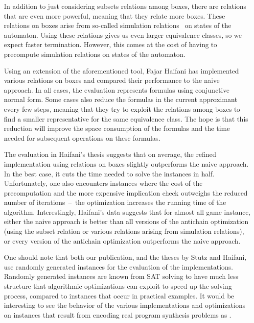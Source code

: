 \documentclass[../../diss.tex]{subfiles}
\begin{document}
In addition to just considering subsets relations among boxes, there are relations that are even more powerful, meaning that they relate more boxes.
These relations on boxes arise from so-called simulation relations~\cite{DillHW91} on states of the automaton.
Using these relations gives us even larger equivalence classes, so we expect faster termination.
However, this comes at the cost of having to precompute simulation relations on states of the automaton.

Using an extension of the aforementioned tool, Fajar Haifani has implemented various relations on boxes and compared their performance to the naive approach.
In all cases, the evaluation represents formulas using conjunctive normal form.
Some cases also reduce the formulas in the current approximant every few steps, meaning that they try to exploit the relations among boxes to find a smaller representative for the same equivalence class.
The hope is that this reduction will improve the space consumption of the formulas and the time needed for subsequent operations on these formulas.

The evaluation in Haifani's thesis suggests that on average, the refined implementation using relations on boxes slightly outperforms the naive approach.
In the best case, it cuts the time needed to solve the instances in half.
Unfortunately, one also encounters instances where the cost of the precomputation and the more expensive implication check outweighs the reduced number of iterations~--~the optimization increases the running time of the algorithm.
Interestingly, Haifani's data suggests that for almost all game instance, either the naive approach is better than all versions of the antichain optimization (using the subset relation or various relations arising from simulation relations), or every version of the antichain optimization outperforms the naive approach.

One should note that both our publication, and the theses by Stutz and Haifani, use randomly generated instances for the evaluation of the implementations.
Randomly generated instances are known from \eg SAT solving to have much less structure that algorithmic optimizations can exploit to speed up the solving process, compared to instances that occur in practical examples.
It would be interesting to see the behavior of the various implementations and optimizations on instances that result from \eg encoding real program synthesis problems as .
\end{document}
